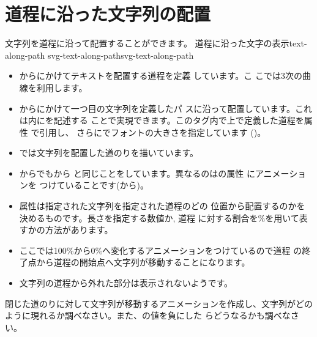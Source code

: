 \section{道程に沿った文字列の配置}
文字列を道程に沿って配置することができます。
    {道程に沿った文字の表示}{text-along-path}
{}
{svg-text-along-path}{svg-text-along-path}
\begin{itemize}
 \item {}からにかけてテキストを配置する道程を定義
       しています。こ
       こでは3次の\Bezier 曲線を利用します。
 \item {}からにかけて一つ目の文字列を定義したパ
       スに沿って配置しています。これは内にを記述する
       ことで実現できます。このタグ内で上で定義した道程を属性
       で引用し、
       さらにでフォントの大きさを指定しています
       ()。
 \item {}では文字列を配置した道のりを描いています。
 \item {}からでもから
       と同じことをしています。異なるのはの属性
       にアニメーションを
       つけていることです(から)。
 \item 属性は指定された文字列を指定された道程のどの
       位置から配置するのかを決めるものです。長さを指定する数値か, 道程
       に対する割合を\%を用いて表すかの方法があります。
 \item ここでは100\%から0\%へ変化するアニメーションをつけているので道程
       の終了点から道程の開始点へ文字列が移動することになります。
 \item 文字列の道程から外れた部分は表示されないようです。
\end{itemize}
\begin{Problem}
閉じた道のりに対して文字列が移動するアニメーションを作成し、文字列がどの
 ように現れるか調べなさい。また、の値を負にした
 らどうなるかも調べなさい。
\end{Problem}
\ifSeminor
\else
